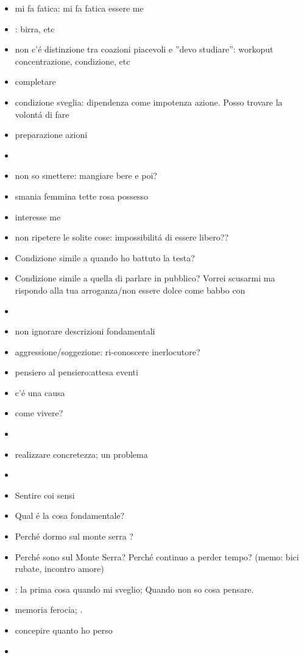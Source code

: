 \begin{itemize}
\item mi fa fatica: mi fa fatica essere me
\item {}: birra, etc
\item non c'\'e distinzione tra coazioni piacevoli e ''devo studiare'': workoput concentrazione, condizione, etc
\item completare 
\item condizione sveglia: dipendenza come impotenza azione.
Posso trovare la volont\'a di fare 
\item preparazione azioni
\item {}
\item non so smettere: mangiare bere e poi?
\item smania femmina tette rosa possesso
\item interesse me
\item non ripetere le solite cose: impossibilit\'a di essere libero??
\item Condizione simile a quando ho battuto la testa? 
\item Condizione simile a quella di parlare in pubblico?
Vorrei scusarmi ma rispondo alla tua arroganza/non essere dolce come babbo con 
\item {}
\item non ignorare  descrizioni fondamentali
\item aggressione/soggezione: ri-conoscere inerlocutore? 
\item pensiero al pensiero:attesa eventi
\item c'\'e una causa
\item come vivere?
\item {} 
\item realizzare concretezza; un problema
\item {}
\item Sentire coi sensi
\item Qual \'e la cosa fondamentale?
\item Perch\'e dormo sul monte serra ?
\item Perch\'e sono sul Monte Serra? Perch\'e continuo a perder tempo? (memo: bici rubate, incontro amore)
\item {}: la prima cosa quando mi sveglio;
Quando non so cosa pensare.
\item memoria ferocia; .
\item concepire quanto  ho perso
\item {}
\end{itemize}

